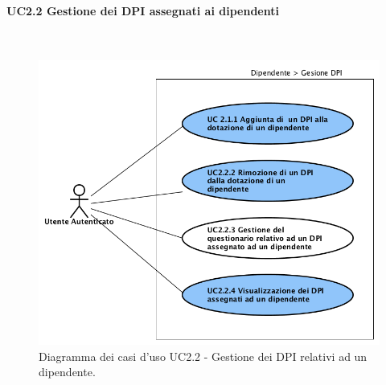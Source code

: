 		\paragraph*{UC2.2 Gestione dei DPI assegnati ai dipendenti}\mbox{} \\
			\label{section:UC2_2}
			\begin{figure}[H]
				\begin{center}
					\includegraphics[width=12cm]{Pics/UC2_2DPIDipendenti.png}
					\caption{
						Diagramma dei casi d'uso UC2.2 - Gestione dei DPI relativi ad un dipendente.}
					\label{fig:UC2_2GestioneDPIDipendenti}
				\end{center}
			\end{figure}
